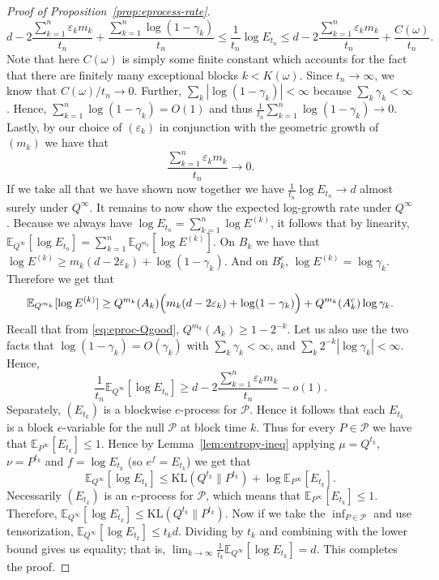 \documentclass[11pt]{article}
\newcommand{\KL}{\mathrm{KL}}
\newcommand{\E}{\mathbb{E}}
\newcommand{\Pcal}{\mathcal{P}}
\theoremstyle{definition}
\theoremstyle{definition}
\begin{document}
\begin{proof}[Proof of Proposition~\ref{prop:eprocess-rate}]
\[
d-2\frac{\sum_{k=1}^n \varepsilon_k m_k}{t_n} +\frac{\sum_{k=1}^n \log(1-\gamma_k)}{t_n} \le \frac{1}{t_n}\log E_{t_n} \le d-2\frac{\sum_{k=1}^n \varepsilon_k m_k}{t_n} +\frac{C(\omega)}{t_n}.
\]
Note that here $C(\omega)$ is simply some finite constant which accounts for the fact that there are finitely many exceptional blocks $k<K(\omega)$. Since $t_n\to\infty$, we know that $C(\omega)/t_n\to 0$. Further, $\sum_k |\log(1-\gamma_k)|<\infty$ because $\sum_k \gamma_k<\infty$. Hence, $\sum_{k=1}^n \log(1-\gamma_k)=O(1)$ and thus $\frac{1}{t_n}\sum_{k=1}^n \log(1-\gamma_k)\to 0$. Lastly, by our choice of $(\varepsilon_k)$ in conjunction with the geometric growth of $(m_k)$ we have that
\[
\frac{\sum_{k=1}^n \varepsilon_k m_k}{t_n}\longrightarrow 0.
\]
If we take all that we have shown now together we have $\frac{1}{t_n}\log E_{t_n}\to d$ almost surely under $Q^\infty$. It remains to now show the expected log-growth rate under $Q^\infty$. Because we always have $\log E_{t_n}=\sum_{k=1}^n \log E^{(k)}$, it follows that by linearity, $\E_{Q^\infty}[\log E_{t_n}]=\sum_{k=1}^n \E_{Q^{m_k}}[\log E^{(k)}]$. On $B_k$ we have that $\log E^{(k)}\ge m_k(d-2\varepsilon_k)+\log(1-\gamma_k)$. And on $B_k^c$, $\log E^{(k)}=\log\gamma_k$. Therefore we get that
\[
\E_{Q^{m_k}}[\log E^{(k)}] \ge Q^{m_k}(A_k)\Bigl(m_k(d-2\varepsilon_k)+\log(1-\gamma_k)\Bigr) +Q^{m_k}(A_k^c)\log\gamma_k.
\]
Recall that from \eqref{eq:eproc-Qgood}, $Q^{m_k}(A_k)\ge 1-2^{-k}$. Let us also use the two facts that $\log(1-\gamma_k)=O(\gamma_k)$ with $\sum_k\gamma_k<\infty$, and $\sum_k 2^{-k}|\log\gamma_k|<\infty$. Hence,
\[
\frac{1}{t_n}\E_{Q^\infty}[\log E_{t_n}] \ge d-2\frac{\sum_{k=1}^n \varepsilon_k m_k}{t_n} - o(1).
\]
Separately, $(E_{t_k})$ is a blockwise $e$-process for $\Pcal$. Hence it follows that each $E_{t_k}$ is a block $e$-variable for the null $\Pcal$ at block time $k$. Thus for every $P\in\Pcal$ we have that $\E_{P^\infty}[E_{t_k}]\le 1$. Hence by Lemma~\ref{lem:entropy-ineq} applying $\mu=Q^{t_k}$, $\nu=P^{t_k}$ and $f=\log E_{t_k}$ (so $e^f=E_{t_k}$) we get that
\[
\E_{Q^\infty}[\log E_{t_k}]\le \KL(Q^{t_k}\|P^{t_k})+\log \E_{P^\infty}[E_{t_k}].
\]
Necessarily $(E_{t_k})$ is an $e$-process for $\Pcal$, which means that $\E_{P^\infty}[E_{t_k}]\le 1$. Therefore, $\E_{Q^\infty}[\log E_{t_k}]\le \KL(Q^{t_k}\|P^{t_k})$. Now if we take the $\inf_{P\in\Pcal}$ and use tensorization, $\E_{Q^\infty}[\log E_{t_k}]\le t_k d$.
Dividing by $t_k$ and combining with the lower bound gives us equality; that is, $\lim_{k\to\infty}\frac{1}{t_k}\E_{Q^\infty}[\log E_{t_k}]=d$. This completes the proof.
\end{proof}
\end{document}
